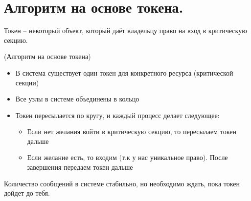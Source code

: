 \section{Алгоритм на основе токена.}

\begin{definition}
    Токен -- некоторый объект, который даёт владельцу право на вход в критическую секцию.
\end{definition}

\begin{algorithm}(Алгоритм на основе токена)
\begin{itemize}
    \item В система существует один токен для конкретного ресурса (критической секции)
    \item Все узлы в системе объединены в кольцо
    \item Токен пересылается по кругу, и каждый процесс делает следующее:
        \begin{itemize}
            \item Если нет желания войти в критическую секцию, то пересылаем токен дальше
            \item Если желание есть, то входим (т.к у нас уникальное право). После завершения передаем токен дальше
        \end{itemize}
\end{itemize}
\end{algorithm}

\begin{remark}
    Количество сообщений в системе стабильно, но необходимо ждать, пока токен дойдет до тебя.
\end{remark}
